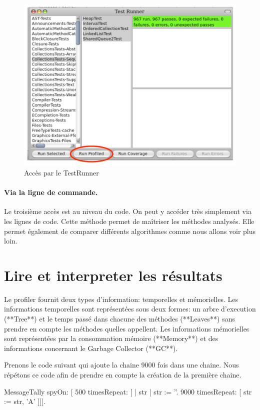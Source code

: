 \documentclass[a4paper,10pt,twoside]{book}
\begin{document}
\begin{figure}[h]
	\begin{center}
	\includegraphics[width=.8\linewidth]{testRunner}
	\caption{Acc\`es par le TestRunner}
	\end{center}
\end{figure}


\paragraph{Via la ligne de commande.}
Le troisi\`eme acc\`es est au niveau du code. On peut y acc\'eder tr\`es simplement via les lignes de code. Cette m\'ethode permet de ma\^itriser les m\'ethodes analys\'es. Elle permet \'egalement de comparer diff\'erents algorithmes comme nous allons voir plus loin.


\section{Lire et interpreter les r\'esultats} 
Le profiler fournit deux types d'information: temporelles et m\'emorielles. Les informations temporelles sont repr\'esent\'ees sous deux formes: un arbre d'execution (**Tree**) et le temps pass\'e dans chacune des m\'ethodes (**Leaves**) sans prendre en compte les m\'ethodes quelles appellent. Les informations m\'emorielles sont repr\'esent\'ees par la consommation m\'emoire (**Memory**) et des informations concernant le Garbage Collector (**GC**).


Prenons le code suivant qui ajoute la chaine  9000 fois dans
une chaine. Nous r\'ep\'etons ce code afin de prendre en compte la
cr\'eation de la premi\`ere chaine. 

\begin{code}{}
MessageTally spyOn: 
     [ 500 timesRepeat: [
                     | str |  
                     str := ''. 
                     9000 timesRepeat: [ str := str, 'A' ]]].
\end{code} 
\end{document}
